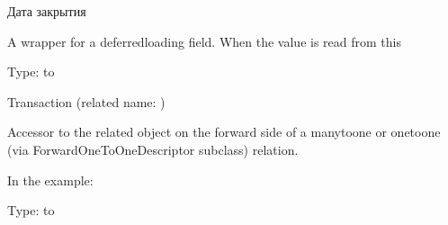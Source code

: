 \documentclass[letterpaper,10pt,russian]{sphinxmanual}
\begin{document}
\begin{fulllineitems}
\begin{fulllineitems}
\sphinxAtStartPar
Дата закрытия

\sphinxAtStartPar
A wrapper for a deferred\sphinxhyphen{}loading field. When the value is read from this

\end{fulllineitems}


\begin{fulllineitems}
\label{\detokenize{myapp:polls.models.Deposit.transaction}}
\pysigstartsignatures
\pysigline
{}
\pysigstopsignatures
\sphinxAtStartPar
Type:  to {\hyperref[\detokenize{myapp:polls.models.Transaction}]{}}

\sphinxAtStartPar
Transaction (related name: {\hyperref[\detokenize{myapp:polls.models.Transaction.deposits}]{}})

\sphinxAtStartPar
Accessor to the related object on the forward side of a many\sphinxhyphen{}to\sphinxhyphen{}one or
one\sphinxhyphen{}to\sphinxhyphen{}one (via ForwardOneToOneDescriptor subclass) relation.

\sphinxAtStartPar
In the example:

\begin{sphinxVerbatim}[commandchars=\\\{\}]
       
\end{sphinxVerbatim}

\end{fulllineitems}


\begin{fulllineitems}
\label{\detokenize{myapp:polls.models.Deposit.bank}}
\pysigstartsignatures
\pysigline
{}
\pysigstopsignatures
\sphinxAtStartPar
Type:  to {\hyperref[\detokenize{myapp:polls.models.Bank}]{}}


\end{fulllineitems}
\end{fulllineitems}
\end{document}
